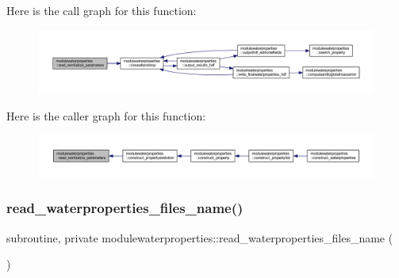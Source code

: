 Here is the call graph for this function\+:\nopagebreak
\begin{figure}[H]
\begin{center}
\leavevmode
\includegraphics[width=350pt]{namespacemodulewaterproperties_adb847af3f3968c2d9bf627677cb37d95_cgraph}
\end{center}
\end{figure}
Here is the caller graph for this function\+:\nopagebreak
\begin{figure}[H]
\begin{center}
\leavevmode
\includegraphics[width=350pt]{namespacemodulewaterproperties_adb847af3f3968c2d9bf627677cb37d95_icgraph}
\end{center}
\end{figure}
\mbox{\label{namespacemodulewaterproperties_ae31629679bdc4c42e1d3884a2f046435}} 
\subsubsection{\texorpdfstring{read\+\_\+waterproperties\+\_\+files\+\_\+name()}{read\_waterproperties\_files\_name()}}
{\footnotesize\ttfamily subroutine, private modulewaterproperties\+::read\+\_\+waterproperties\+\_\+files\+\_\+name (\begin{DoxyParamCaption}{ }\end{DoxyParamCaption})\hspace{0.3cm}{\ttfamily [private]}}

